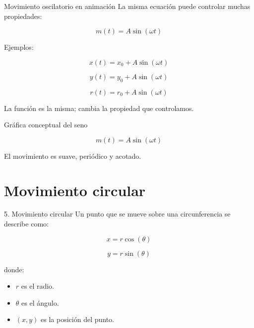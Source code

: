 \documentclass{beamer}
\begin{document}
\begin{frame}{Movimiento oscilatorio en animación}
La misma ecuación puede controlar muchas propiedades:

\[
m(t)=A\sin(\omega t)
\]

\medskip

Ejemplos:

\[
x(t)=x_0+A\sin(\omega t)
\]

\[
y(t)=y_0+A\sin(\omega t)
\]

\[
r(t)=r_0+A\sin(\omega t)
\]

\medskip

La función es la misma; cambia la propiedad que controlamos.
\end{frame}

\begin{frame}{Gráfica conceptual del seno}
\begin{center}
\end{center}

\[
m(t)=A\sin(\omega t)
\]

El movimiento es suave, periódico y acotado.
\end{frame}

\section{Movimiento circular}

\begin{frame}{5. Movimiento circular}
Un punto que se mueve sobre una circunferencia se describe como:

\[
x=r\cos(\theta)
\]

\[
y=r\sin(\theta)
\]

donde:

\begin{itemize}
    \item \(r\) es el radio.
    \item \(\theta\) es el ángulo.
    \item \((x,y)\) es la posición del punto.
\end{itemize}
\end{frame}
\end{document}
